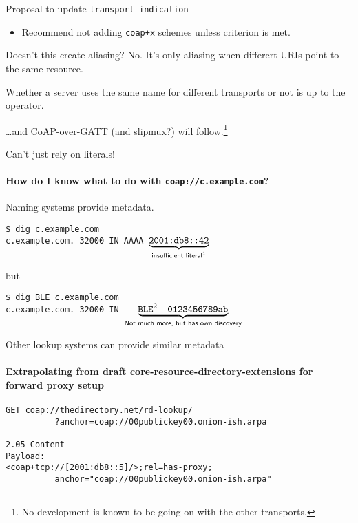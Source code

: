 \documentclass[aspectratio=169,colorlinks]{beamer}
\newcommand{\ietfdraft}[1]{\href{https://datatracker.ietf.org/doc/draft-#1/}{draft #1}}
\begin{document}
\begin{frame}{Proposal to update \texttt{transport-indication}}\large
  \begin{itemize}
    \item Recommend not adding \texttt{coap+x} schemes unless criterion is met.
  \end{itemize}

  \begin{block}{Doesn't this create aliasing?}
    No. It's only aliasing when differert URIs point to the same resource.

    Whether a server uses the same name for different transports or not is up to the operator.
  \end{block}

  \bigskip

  \ldots and CoAP-over-GATT (and slipmux?) will follow.\footnote{No development is known to be going on with the other transports.}
\end{frame}

\begin{frame}{Can't just rely on literals!}\large
  \framesubtitle{How do I know what to do with \texttt{coap://c.example.com}?}

  Naming systems provide metadata.

  \bigskip

  \texttt{{\color{gray}\$} dig c.example.com}\\
  \texttt{c.example.com. 32000 IN AAAA $\underbrace{\texttt{2001:db8::42}}_{\textsf{insufficient literal\footnotemark[1]}}$}

  but

  \texttt{{\color{gray}\$} dig BLE c.example.com}\\
  \texttt{c.example.com. 32000 IN $\underbrace{\texttt{BLE\footnotemark[2]\quad 0123456789ab}}_{\textsf{Not much more, but has own discovery}}$}
\end{frame}

\begin{frame}[fragile]{Other lookup systems can provide similar metadata}\large
  \framesubtitle{Extrapolating from \ietfdraft{core-resource-directory-extensions} for forward proxy setup}

\begin{verbatim}
GET coap://thedirectory.net/rd-lookup/
          ?anchor=coap://00publickey00.onion-ish.arpa

2.05 Content
Payload:
<coap+tcp://[2001:db8::5]/>;rel=has-proxy;
          anchor="coap://00publickey00.onion-ish.arpa"
\end{verbatim}
\end{frame}
\end{document}
